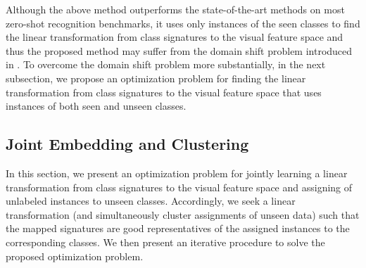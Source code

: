 \documentclass[10pt,twocolumn,letterpaper]{article}
\begin{document}
Although the above method outperforms the state-of-the-art methods on most zero-shot recognition benchmarks, it uses only instances of the seen classes to find the linear transformation from class signatures to the visual feature space and thus the proposed method may suffer from the domain shift problem introduced in \cite{eccv14}.
To overcome the domain shift problem more substantially, in the next subsection, we propose an optimization problem for finding the linear transformation from class signatures to the visual feature space that uses instances of both seen and unseen classes.

\subsection{Joint Embedding and Clustering}
\label{joint}
In this section,
 we present an optimization problem for jointly learning a linear transformation
from class signatures to the visual feature space and assigning of unlabeled instances to unseen classes.
Accordingly, we seek a linear transformation (and simultaneously cluster assignments of unseen data)
such that the mapped signatures are good representatives of the assigned instances to the corresponding classes.
 We then present an iterative procedure to solve the proposed optimization problem.
\end{document}
